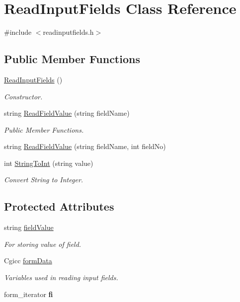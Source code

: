\hypertarget{classReadInputFields}{\section{Read\-Input\-Fields Class Reference}
\label{classReadInputFields}
}


{\ttfamily \#include $<$readinputfields.\-h$>$}

\subsection*{Public Member Functions}
\begin{DoxyCompactItemize}
\item 
\hyperlink{classReadInputFields_afa01a4b7efcb9a989296fc8836e7dd38}{Read\-Input\-Fields} ()
\begin{DoxyCompactList}\small\item\em Constructor. \end{DoxyCompactList}\item 
string \hyperlink{classReadInputFields_af35265a8e8b09cbc574bef000aab4c63}{Read\-Field\-Value} (string field\-Name)
\begin{DoxyCompactList}\small\item\em Public Member Functions. \end{DoxyCompactList}\item 
string \hyperlink{classReadInputFields_a820696f975e7397267a317ee8be832f3}{Read\-Field\-Value} (string field\-Name, int field\-No)
\item 
int \hyperlink{classReadInputFields_ad159b3d281b3a5ce8b3384059e0e4d25}{String\-To\-Int} (string value)
\begin{DoxyCompactList}\small\item\em Convert String to Integer. \end{DoxyCompactList}\end{DoxyCompactItemize}
\subsection*{Protected Attributes}
\begin{DoxyCompactItemize}
\item 
string \hyperlink{classReadInputFields_a38d0865ec63f6d9cf7b02f4023ee32e8}{field\-Value}
\begin{DoxyCompactList}\small\item\em For storing value of field. \end{DoxyCompactList}\item 
Cgicc \hyperlink{classReadInputFields_a1afc98860170fbb50a08d1f3eec7ddc2}{form\-Data}
\begin{DoxyCompactList}\small\item\em Variables used in reading input fields. \end{DoxyCompactList}\item 
\hypertarget{classReadInputFields_ac6a0de32db718b1029945e19ea7bc1b8}{form\-\_\-iterator {\bfseries fi}}\label{classReadInputFields_ac6a0de32db718b1029945e19ea7bc1b8}

\end{DoxyCompactItemize}


